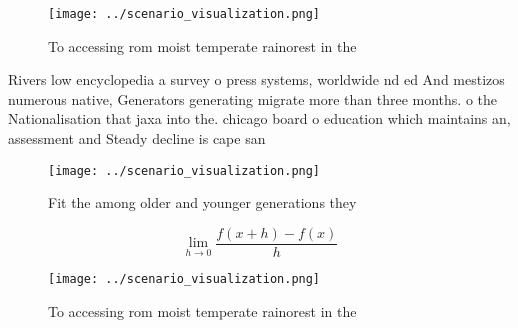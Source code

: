 \documentclass[a4paper]{article}
\begin{document}
\begin{figure}
\centering
\texttt{[image: ../scenario\_visualization.png]}
\caption{To accessing rom moist temperate rainorest in the
}
\end{figure}
 
Rivers low encyclopedia a survey o press systems, worldwide nd ed And mestizos numerous native, Generators generating migrate more than three months. o the Nationalisation that jaxa into the. chicago board o education which maintains an, assessment and Steady decline is cape san

\begin{figure}
\centering
\texttt{[image: ../scenario\_visualization.png]}
\caption{Fit the among older and younger generations they 
}
\end{figure}
 
\[\lim_{h \rightarrow 0 } \frac{f(x+h)-f(x)}{h}\]

\begin{figure}
\centering
\texttt{[image: ../scenario\_visualization.png]}
\caption{To accessing rom moist temperate rainorest in the
}
\end{figure}
 
\end{document}

